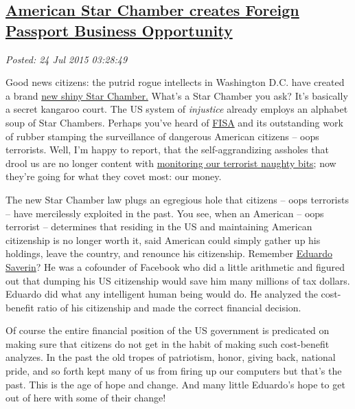 %

\subsection*{\href{https://bakerjd99.wordpress.com/2015/07/23/american-star-chamber-creates-foreign-passport-business-opportunity/}{American Star Chamber creates Foreign Passport Business Opportunity}}


\noindent\emph{Posted: 24 Jul 2015 03:28:49}
\vspace{6pt}

Good news citizens: the putrid rogue intellects in Washington D.C. have
created a brand
\href{http://dailyreckoning.com/u-s-war-on-your-passport-continues/}{new
shiny Star Chamber.} What's a Star Chamber you ask? It's basically a
secret kangaroo court. The US system of \emph{injustice} already employs
an alphabet soup of Star Chambers. Perhaps you've heard of
\href{https://en.wikipedia.org/wiki/United_States_Foreign_Intelligence_Surveillance_Court}{FISA}
and its outstanding work of rubber stamping the surveillance of
dangerous American citizens -- oops terrorists. Well, I'm happy to
report, that the self-aggrandizing assholes that drool us are no longer
content with
\href{http://www.bbc.com/news/technology-25118156}{monitoring our
terrorist naughty bits}; now they're going for what they covet most: our
money.

The new Star Chamber law plugs an egregious hole that citizens -- oops
terrorists -- have mercilessly exploited in the past. You see, when an
American -- oops terrorist -- determines that residing in the US and
maintaining American citizenship is no longer worth it, said American
could simply gather up his holdings, leave the country, and renounce his
citizenship. Remember
\href{http://www.huffingtonpost.com/huff-wires/20120515/as-facebook-saverin-singapore/}{Eduardo
Saverin}? He was a cofounder of Facebook who did a little arithmetic
and figured out that dumping his US citizenship would save him many
millions of tax dollars. Eduardo did what any intelligent human being
would do. He analyzed the cost-benefit ratio of his citizenship and made
the correct financial decision.

Of course the entire financial position of the US government is
predicated on making sure that citizens do not get in the habit of
making such cost-benefit analyzes. In the past the old tropes of
patriotism, honor, giving back, national pride, and so forth kept many
of us from firing up our computers but that's the past. This is the age
of hope and change. And many little Eduardo's hope to get out of here
with some of their change!

